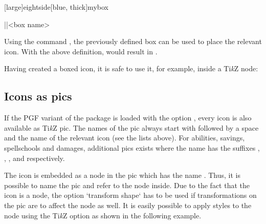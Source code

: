 \documentclass[a4paper]{article}
\begin{document}
[large]{eightside}[blue, thick]{mybox}

\begin{macrodef}|\useprotecteddndicon|{<box name>}\end{macrodef}
Using the command \macro{\useprotecteddndicon}, the previously defined box can be used to place the relevant icon. With the above definition,  would result in .

Having created a boxed icon, it is safe to use it, for example, inside a Ti\emph{k}Z node:

\begin{codeexample}
\end{codeexample}


\subsection{Icons as pics}\label{sec:pics}

If the PGF variant of the package is loaded with the option , every icon is also available as Ti\emph{k}Z pic. The names of the pic always start with  followed by a space and the name of the relevant icon (see the lists above). For abilities, savings, spellschools and damages, additional pics exists where the name has the suffixes , , , and  respectively.

The icon is embedded as a node in the pic which has the name . Thus, it is possible to name the pic and refer to the node inside. Due to the fact that the icon is a node, the option `transform shape` has to be used if transformations on the pic are to affect the node as well. It is easily possible to apply styles to the node using the Ti\emph{k}Z option  as shown in the following example.

\begin{codeexample}
\end{codeexample}
\end{document}
